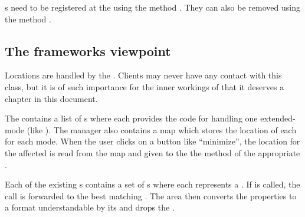 s need to be registered at the  using the method . They can also be removed using the method . 


 
\subsection{The frameworks viewpoint} \label{sec:clocationmodemanager}
Locations are handled by the . Clients may never have any contact with this class, but it is of such importance for the inner workings of  that it deserves a chapter in this document.

The  contains a list of s where each  provides the code for handling one extended-mode (like \linebreak {}). The manager also contains a map which stores the location of each  for each mode. When the user clicks on a button like ``minimize'', the location for the affected  is read from the map and given to the the  method of the appropriate .

Each of the existing s contains a set of s where each  represents a . If  is called, the call is forwarded to the best matching . The area then converts the properties to a format understandable by its  and drops the .


